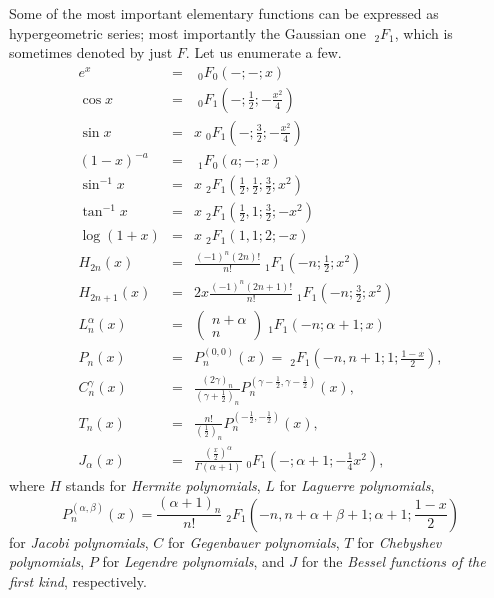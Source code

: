 Some of the most important elementary functions can be expressed as hypergeometric series; most importantly the Gaussian one ${\;}_2F_1$,
which is
sometimes denoted by just $F$.
Let us enumerate a few.
\begin{eqnarray}
e^x
&=&
{\;}_0F_0\left(-;-;x\right)
\\
\cos x
&=&
{\;}_0F_1\left(-;\frac{1}{2};-\frac{x^2}{4}\right)
\\
\sin x
&=&
x
{\;}_0F_1\left(-;\frac{3}{2};-\frac{x^2}{4}\right)
\\
(1-x)^{-a}
&=&
{\;}_1F_0\left(a;-  ;x\right)
\\
\sin^{-1} x
&=&
x
{\;}_2F_1\left(\frac{1}{2},\frac{1}{2};\frac{3}{2};x^2\right)
\\
\tan^{-1} x
&=&
x
{\;}_2F_1\left(\frac{1}{2},1;\frac{3}{2};-x^2\right)
\\
\log (1 + x)
&=&
x
{\;}_2F_1\left(1,1;2;-x\right)
\\
H_{2n}(x)
&=&
\frac{(-1)^n(2n)!}{n!}
{\;}_1F_1\left(-n;\frac{1}{2}; x^2\right)
\\
H_{2n+1}(x)
&=&
2x
\frac{(-1)^n(2n+1)!}{n!}
{\;}_1F_1\left(-n;\frac{3}{2}; x^2\right)
\\
L_{n}^\alpha (x)
&=&
\left(
\begin{array}{c}
n+\alpha\\
n
\end{array}
\right)
{\;}_1F_1\left(-n;\alpha +1; x\right)
\\
P_{n}(x)
&=&   P^{(0, 0 )}_n (x)
=
{\;}_2F_1\left(-n,n+1; 1;\frac{1- x}{2}\right) ,
\\
C_{n}^\gamma (x)
&=& \frac{(2\gamma )_n}{\left( \gamma +\frac{1}{2}\right)_n}  P^{(\gamma -\frac{1}{2}, \gamma -\frac{1}{2} )}_n (x)
 ,
\\
T_{n}  (x)
&=& \frac{n!}{\left(  \frac{1}{2}\right)_n}  P^{( -\frac{1}{2},  -\frac{1}{2} )}_n (x)
,
\\
J_{\alpha }  (x)
&=& \frac{\left(\frac{x}{2}\right)^\alpha }{\Gamma (\alpha +1)}
{\;}_0F_1\left(- ; \alpha +1;-\frac{1 }{4}x^2\right) ,
\end{eqnarray}
where
$H$ stands for
{\em Hermite polynomials},
$L$ for
{\em Laguerre polynomials},
\begin{equation}
P^{(\alpha, \beta )}_n (x)
=\frac{(\alpha +1)_n}{n!} {\;}_2F_1\left( -n,n+\alpha +\beta +1; \alpha +1;\frac{1- x}{2}\right)
\end{equation}
for
{\em Jacobi polynomials},
$C$ for
{\em Gegenbauer polynomials},
$T$ for
{\em Chebyshev polynomials},
$P$  for
{\em Legendre polynomials},
and
$J$  for   the
{\em Bessel functions of the first kind},
respectively.

